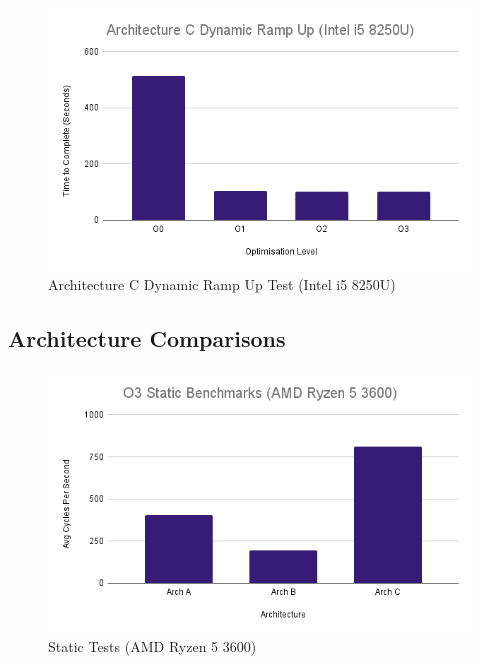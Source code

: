 \documentclass{article}
\begin{document}
\begin{figure}[!h]
\centering
\includegraphics[scale=0.5]{Architecture C Dynamic Ramp Up (Intel i5 8250U).png}
\caption{Architecture C Dynamic Ramp Up Test (Intel i5 8250U)}
\label{arch_c_dynamic_ramp_up_laptop}
\end{figure}

\clearpage

\subsection{Architecture Comparisons}
\label{arch_comparison}
\begin{figure}[!h]
\centering
\includegraphics[scale=0.5]{O3 Static Benchmarks (AMD Ryzen 5 3600).png}
\caption{Static Tests (AMD Ryzen 5 3600)}
\label{pc_static_tests}
\end{figure}
\end{document}
